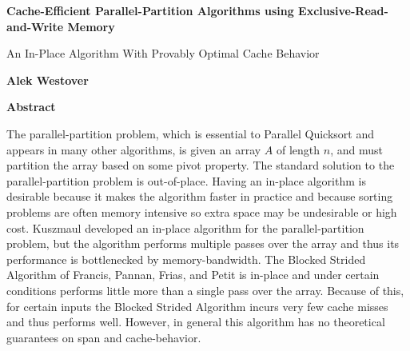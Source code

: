 \documentclass[11pt]{article}
\theoremstyle{remark}
\theoremstyle{remark}
\begin{document}





\begin{titlepage}
    \begin{center}
        \vspace*{1cm}
 
        \Huge
        \textbf{Cache-Efficient Parallel-Partition Algorithms using Exclusive-Read-and-Write Memory}
 
        \vspace{0.5cm}
        \LARGE
				An In-Place Algorithm With Provably Optimal Cache Behavior
 
        \vspace{2.5cm}
 
        \textbf{Alek Westover}



 
				\vfill
 
 
        \Large
 
    \end{center}
\end{titlepage}

\begin{center}
\textbf{Abstract}
\end{center}
 The parallel-partition problem, which is essential to Parallel
	Quicksort and appears in many other algorithms, is given an array $A$ of
	length $n$, and must partition the array based on some pivot property. The
	standard solution to the parallel-partition problem is out-of-place. Having
	an in-place algorithm is desirable because it makes the algorithm faster in
	practice and because sorting problems are often memory intensive so extra
	space may be undesirable or high cost. Kuszmaul developed an in-place
	algorithm for the parallel-partition problem, but the algorithm performs
	multiple passes over the array and thus its performance is bottlenecked by
	memory-bandwidth. The Blocked Strided Algorithm of Francis, Pannan, Frias, and
	Petit is in-place and under certain conditions performs little more than a
	single pass over the array. Because of this, for certain inputs the Blocked
	Strided Algorithm incurs very few cache misses and thus performs well.
	However, in general this algorithm has no theoretical guarantees on span and
	cache-behavior.
\end{document}
